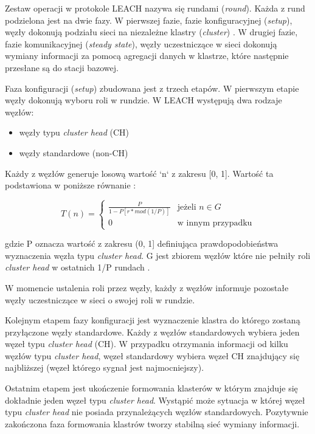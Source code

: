 \documentclass[a4paper,12pt,twoside,openany]{report}
\begin{document}
Zestaw operacji w protokole LEACH nazywa się rundami (\textit{round}). Każda z rund podzielona jest na dwie fazy.
W pierwszej fazie, fazie konfiguracyjnej (\textit{setup}), węzły dokonują podziału sieci na niezależne klastry (\textit{cluster}) \cite{DynamicCH-Jia}.
W drugiej fazie, fazie komunikacyjnej (\textit{steady state}), węzły uczestniczące w sieci dokonują wymiany informacji za pomocą agregacji danych w klastrze, które następnie
przesłane są do stacji bazowej.

Faza konfiguracji (\textit{setup}) zbudowana jest z trzech etapów.
W pierwszym etapie węzły dokonują wyboru roli w rundzie. W LEACH występują dwa rodzaje węzłów:

\begin{itemize}
 \item węzły typu \textit{cluster head} (CH)
 \item węzły standardowe (non-CH)
\end{itemize}

Każdy z węzłów generuje losową wartość `n` z zakresu [0, 1]. Wartość ta podstawiona w poniższe równanie :

\[
T(n) = \begin{cases}
\frac{P}{1 - P[r * mod(1/P)]} & \text{jeżeli } n \in G\\
0 & \text{w innym przypadku}
\end{cases}
\]

gdzie P oznacza wartość z zakresu (0, 1] definiująca prawdopodobieństwa wyznaczenia węzła typu \textit{cluster head}.
G jest zbiorem węzłów które nie pełniły roli \textit{cluster head} w ostatnich 1/P rundach \cite{Bajelan} \cite{ACM-WSN}.

W momencie ustalenia roli przez węzły, każdy z węzłów informuje pozostałe węzły uczestniczące w sieci o swojej roli w rundzie.

Kolejnym etapem fazy konfiguracji jest wyznaczenie klastra do którego zostaną przyłączone węzły standardowe.
Każdy z węzłów standardowych wybiera jeden węzeł typu \textit{cluster head} (CH). W przypadku otrzymania informacji od kilku węzłów typu \textit{cluster head},
węzeł standardowy wybiera węzeł CH znajdujący się najbliższej (węzeł którego sygnał jest najmocniejszy).

Ostatnim etapem jest ukończenie formowania klasterów w którym znajduje się dokładnie jeden węzeł typu \textit{cluster head}.
Wystąpić może sytuacja w której węzeł typu \textit{cluster head} nie posiada przynależących węzłów standardowych.
Pozytywnie zakończona faza formowania klastrów tworzy stabilną sieć wymiany informacji.
\end{document}
